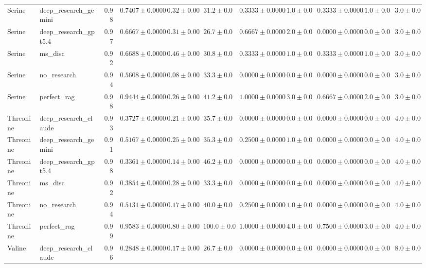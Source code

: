 \begin{table}[htbp]
\begin{tabular}{llrrrrrrrrr}
Serine & deep_research_gemini & 0.98 & $0.7407 \pm 0.0000$ & $0.32 \pm 0.00$ & $31.2 \pm 0.0$ & $0.3333 \pm 0.0000$ & $1.0 \pm 0.0$ & $0.3333 \pm 0.0000$ & $1.0 \pm 0.0$ & $3.0 \pm 0.0$ \\
Serine & deep_research_gpt5.4 & 0.97 & $0.6667 \pm 0.0000$ & $0.31 \pm 0.00$ & $26.7 \pm 0.0$ & $0.6667 \pm 0.0000$ & $2.0 \pm 0.0$ & $0.0000 \pm 0.0000$ & $0.0 \pm 0.0$ & $3.0 \pm 0.0$ \\
Serine & ms_disc & 0.92 & $0.6688 \pm 0.0000$ & $0.46 \pm 0.00$ & $30.8 \pm 0.0$ & $0.3333 \pm 0.0000$ & $1.0 \pm 0.0$ & $0.3333 \pm 0.0000$ & $1.0 \pm 0.0$ & $3.0 \pm 0.0$ \\
Serine & no_research & 0.94 & $0.5608 \pm 0.0000$ & $0.08 \pm 0.00$ & $33.3 \pm 0.0$ & $0.0000 \pm 0.0000$ & $0.0 \pm 0.0$ & $0.0000 \pm 0.0000$ & $0.0 \pm 0.0$ & $3.0 \pm 0.0$ \\
Serine & perfect_rag & 0.98 & \cellcolor{green!25}$0.9444 \pm 0.0000$ & $0.26 \pm 0.00$ & $41.2 \pm 0.0$ & $1.0000 \pm 0.0000$ & $3.0 \pm 0.0$ & $0.6667 \pm 0.0000$ & $2.0 \pm 0.0$ & $3.0 \pm 0.0$ \\
\midrule
Threonine & deep_research_claude & 0.93 & $0.3727 \pm 0.0000$ & $0.21 \pm 0.00$ & $35.7 \pm 0.0$ & $0.0000 \pm 0.0000$ & $0.0 \pm 0.0$ & $0.0000 \pm 0.0000$ & $0.0 \pm 0.0$ & $4.0 \pm 0.0$ \\
Threonine & deep_research_gemini & 0.91 & $0.5167 \pm 0.0000$ & $0.25 \pm 0.00$ & $35.3 \pm 0.0$ & $0.2500 \pm 0.0000$ & $1.0 \pm 0.0$ & $0.0000 \pm 0.0000$ & $0.0 \pm 0.0$ & $4.0 \pm 0.0$ \\
Threonine & deep_research_gpt5.4 & 0.98 & \cellcolor{red!25}$0.3361 \pm 0.0000$ & $0.14 \pm 0.00$ & $46.2 \pm 0.0$ & $0.0000 \pm 0.0000$ & $0.0 \pm 0.0$ & $0.0000 \pm 0.0000$ & $0.0 \pm 0.0$ & $4.0 \pm 0.0$ \\
Threonine & ms_disc & 0.92 & $0.3854 \pm 0.0000$ & $0.28 \pm 0.00$ & $33.3 \pm 0.0$ & $0.0000 \pm 0.0000$ & $0.0 \pm 0.0$ & $0.0000 \pm 0.0000$ & $0.0 \pm 0.0$ & $4.0 \pm 0.0$ \\
Threonine & no_research & 0.94 & $0.5131 \pm 0.0000$ & $0.17 \pm 0.00$ & $40.0 \pm 0.0$ & $0.2500 \pm 0.0000$ & $1.0 \pm 0.0$ & $0.0000 \pm 0.0000$ & $0.0 \pm 0.0$ & $4.0 \pm 0.0$ \\
Threonine & perfect_rag & 0.99 & \cellcolor{green!25}$0.9583 \pm 0.0000$ & $0.80 \pm 0.00$ & $100.0 \pm 0.0$ & $1.0000 \pm 0.0000$ & $4.0 \pm 0.0$ & $0.7500 \pm 0.0000$ & $3.0 \pm 0.0$ & $4.0 \pm 0.0$ \\
\midrule
Valine & deep_research_claude & 0.96 & $0.2848 \pm 0.0000$ & $0.17 \pm 0.00$ & $26.7 \pm 0.0$ & $0.0000 \pm 0.0000$ & $0.0 \pm 0.0$ & $0.0000 \pm 0.0000$ & $0.0 \pm 0.0$ & $8.0 \pm 0.0$ \\

\end{tabular}
\end{table}
